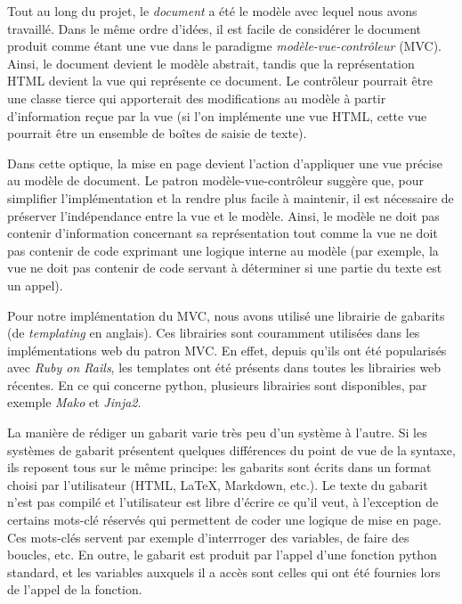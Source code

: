 Tout au long du projet, le \emph{document} a été le modèle avec lequel nous avons travaillé. Dans le même ordre d'idées, il est facile de considérer le document produit comme étant une vue dans le paradigme \emph{modèle-vue-contrôleur} (MVC). Ainsi, le document devient le modèle abstrait, tandis que la représentation HTML devient la vue qui représente ce document. Le contrôleur pourrait être une classe tierce qui apporterait des modifications au modèle à partir d'information reçue par la vue (si l'on implémente une vue HTML, cette vue pourrait être un ensemble de boîtes de saisie de texte).

Dans cette optique, la mise en page devient l'action d'appliquer une vue précise au modèle de document. Le patron modèle-vue-contrôleur suggère que, pour simplifier l'implémentation et la rendre plus facile à maintenir, il est nécessaire de préserver l'indépendance entre la vue et le modèle. Ainsi, le modèle ne doit pas contenir d'information concernant sa représentation tout comme la vue ne doit pas contenir de code exprimant une logique interne au modèle (par exemple, la vue ne doit pas contenir de code servant à déterminer si une partie du texte est un appel).

Pour notre implémentation du MVC, nous avons utilisé une librairie de gabarits (de \emph{templating} en anglais). Ces librairies sont couramment utilisées dans les implémentations web du patron MVC. En effet, depuis qu'ils ont été popularisés avec \emph{Ruby on Rails}, les templates ont été présents dans toutes les librairies web récentes. En ce qui concerne python, plusieurs librairies sont disponibles, par exemple \emph{Mako} et \emph{Jinja2}. 

La manière de rédiger un gabarit varie très peu d'un système à l'autre. Si les systèmes de gabarit présentent quelques différences du point de vue de la syntaxe, ils reposent tous sur le même principe: les gabarits sont écrits dans un format choisi par l'utilisateur (HTML, LaTeX, Markdown, etc.). Le texte du gabarit n'est pas compilé et l'utilisateur est libre d'écrire ce qu'il veut, à l'exception de certains mots-clé réservés qui permettent de coder une logique de mise en page. Ces mots-clés servent par exemple d'interrroger des variables, de faire des boucles, etc. En outre, le gabarit est produit par l'appel d'une fonction python standard, et les variables auxquels il a accès sont celles qui ont été fournies lors de l'appel de la fonction.

